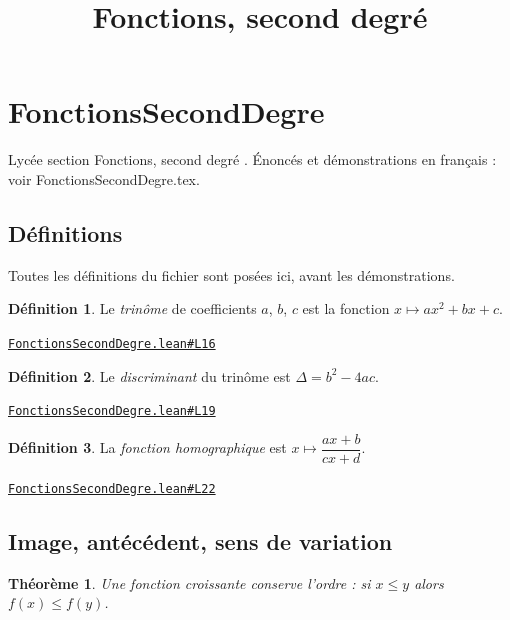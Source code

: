 \documentclass[11pt,a4paper]{article}
\title{Fonctions, second degré}
\date{}
\theoremstyle{definition}
\newtheorem{definition}{Définition}
\theoremstyle{plain}
\newtheorem{theoreme}{Théorème}
\newcommand{\source}[2]{\par\smallskip\noindent\hfill{\footnotesize\href{#1}{\texttt{#2}}}\par\smallskip}
\begin{document}
\maketitle
\sloppy

\section{FonctionsSecondDegre}

\noindent
Lycée \textemdash{} section \og{} Fonctions, second degré \fg{}.
Énoncés et démonstrations en français : voir FonctionsSecondDegre.tex.

\subsection{Définitions}

\noindent
Toutes les définitions du fichier sont posées ici, avant les démonstrations.

\begin{definition}
Le \emph{trinôme} de coefficients $a$, $b$, $c$ est la fonction
$x \mapsto ax^2 + bx + c$.
\end{definition}
\source{https://github.com/Commutator-IO/learn-lean/blob/main/courses/02-lycee/02-fonctions-second-degre/FonctionsSecondDegre.lean\#L16}{FonctionsSecondDegre.lean\#L16}

\begin{definition}
Le \emph{discriminant} du trinôme est $\Delta = b^2 - 4ac$.
\end{definition}
\source{https://github.com/Commutator-IO/learn-lean/blob/main/courses/02-lycee/02-fonctions-second-degre/FonctionsSecondDegre.lean\#L19}{FonctionsSecondDegre.lean\#L19}

\begin{definition}
La \emph{fonction homographique} est $x \mapsto \dfrac{ax + b}{cx + d}$.
\end{definition}
\source{https://github.com/Commutator-IO/learn-lean/blob/main/courses/02-lycee/02-fonctions-second-degre/FonctionsSecondDegre.lean\#L22}{FonctionsSecondDegre.lean\#L22}

\subsection{Image, antécédent, sens de variation}

\begin{theoreme}
Une fonction croissante conserve l'ordre : si $x \le y$ alors $f(x) \le f(y)$.
\end{theoreme}
\end{document}
